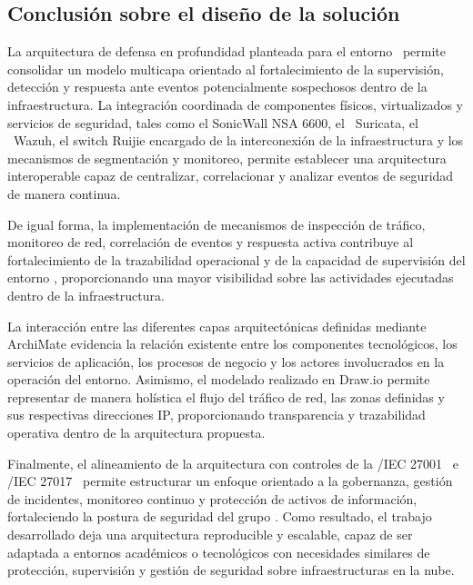 \subsection{Conclusión sobre el diseño de la solución}
\noindent

La arquitectura de defensa en profundidad planteada para el entorno \GRID\ permite consolidar un modelo multicapa orientado al 
fortalecimiento de la supervisión, detección y respuesta ante eventos potencialmente sospechosos dentro de la infraestructura. La 
integración coordinada de componentes físicos, virtualizados y servicios de seguridad, tales como el SonicWall NSA 6600, el \IDPS\ Suricata, 
el \SIEM\ Wazuh, el switch Ruijie encargado de la interconexión de la infraestructura y los mecanismos de segmentación y monitoreo, permite 
establecer una arquitectura interoperable capaz de centralizar, correlacionar y analizar eventos de seguridad de manera continua.

De igual forma, la implementación de mecanismos de inspección de tráfico, monitoreo de red, correlación de eventos y respuesta activa 
contribuye al fortalecimiento de la trazabilidad operacional y de la capacidad de supervisión del entorno \GRID, proporcionando una mayor 
visibilidad sobre las actividades ejecutadas dentro de la infraestructura.

La interacción entre las diferentes capas arquitectónicas definidas mediante ArchiMate evidencia la relación existente entre los 
componentes tecnológicos, los servicios de aplicación, los procesos de negocio y los actores involucrados en la operación del entorno. 
Asimismo, el modelado realizado en Draw.io permite representar de manera holística el flujo del tráfico de red, las zonas definidas y sus 
respectivas direcciones IP, proporcionando transparencia y trazabilidad operativa dentro de la arquitectura propuesta.

Finalmente, el alineamiento de la arquitectura con controles de la \ISO/IEC 27001~\cite{iso27001} e \ISO/IEC 27017~\cite{iso27017} permite 
estructurar un enfoque orientado a la gobernanza, gestión de incidentes, monitoreo continuo y protección de activos de información, 
fortaleciendo la postura de seguridad del grupo \GRID. Como resultado, el trabajo desarrollado deja una arquitectura reproducible y 
escalable, capaz de ser adaptada a entornos académicos o tecnológicos con necesidades similares de protección, supervisión y gestión de 
seguridad sobre infraestructuras en la nube.